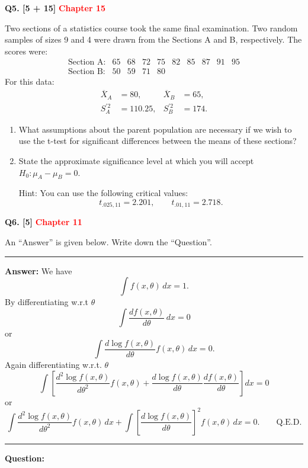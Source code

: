 \documentclass[11pt]{article}
\begin{document}
\bigskip
\textbf{Q5. [5 + 15]}  \textbf{\textcolor{red}{Chapter 15}}

Two sections of a statistics course took the same final examination. Two random samples of sizes 9 and 4 were drawn from the Sections A and B, respectively. The scores were:
\[
\begin{array}{lrrrrrrrrr}
\text{Section A:}&65&68&72&75&82&85&87&91&95\\
\text{Section B:}&50&59&71&80&&&&&
\end{array}
\]
For this data:
\[
\begin{aligned}
\overline{X}_A&=80, &\overline{X}_B&=65,\\
S_A^{\prime 2}&=110.25, & S_B^{\prime 2}&=174.
\end{aligned}
\]
\begin{enumerate}
\setlength{\itemsep}{5pt}\setlength{\parsep}{0pt}\setlength{\topsep}{3pt}
\item[(a)] What assumptions about the parent population are necessary if we wish to use the t-test for significant differences between the means of these sections?
\item[(b)] State the approximate significance level at which you will accept $H_0:\mu_A-\mu_B=0$.

Hint: You can use the following critical values:
\[
t_{.025,11}=2.201,\qquad t_{.01,11}=2.718.
\]
\end{enumerate}

\bigskip
\textbf{Q6. [5]}  \textbf{\textcolor{red}{Chapter 11}}

An ``Answer'' is given below. Write down the ``Question''.

\medskip
\hrule
\medskip

\textbf{Answer:} We have
\[
\int f(x,\theta)\,dx=1.
\]
By differentiating w.r.t $\theta$
\[
\int\frac{df(x,\theta)}{d\theta}\,dx=0
\]
or
\[
\int\frac{d\log f(x,\theta)}{d\theta}f(x,\theta)\,dx=0.
\]
Again differentiating w.r.t. $\theta$
\[
\int\left[
\frac{d^2\log f(x,\theta)}{d\theta^2}f(x,\theta)
+\frac{d\log f(x,\theta)}{d\theta}
\frac{df(x,\theta)}{d\theta}
\right]dx=0
\]
or
\[
\int\frac{d^2\log f(x,\theta)}{d\theta^2}f(x,\theta)\,dx
+\int\left[\frac{d\log f(x,\theta)}{d\theta}\right]^2
f(x,\theta)\,dx=0.\qquad\mathrm{Q.E.D.}
\]

\medskip
\hrule
\medskip
\textbf{Question:}




\clearpage
\end{document}

